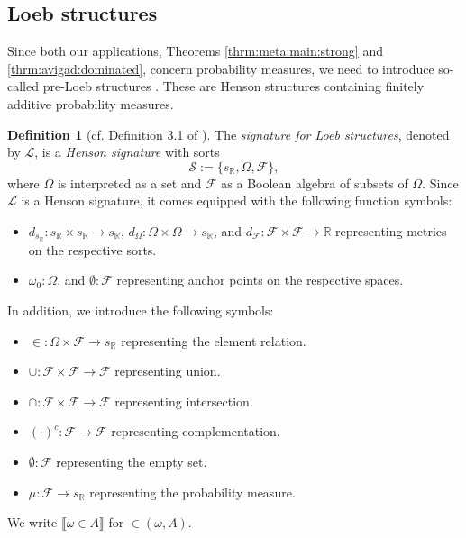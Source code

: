 \documentclass[11pt]{amsart}
\theoremstyle{definition}
\newtheorem{definition}[theorem]{Definition}
\theoremstyle{remark}
\def\RR{\mathbb{R}}
\newcommand{\model}[1]{\llbracket {#1} \rrbracket }
\begin{document}
\subsection{Loeb structures}
\label{subsec:ultra}
Since both our applications, Theorems \ref{thrm:meta:main:strong} and \ref{thrm:avigad:dominated}, concern probability measures, we need to introduce so-called pre-Loeb structures \cite{DI2017}. These are Henson structures containing finitely additive probability measures.
\begin{definition}[cf. Definition 3.1 of \cite{DI2017}]
    The \emph{signature for Loeb structures}, denoted by $\mathcal{L}$, is a \emph{Henson signature} with sorts
    \[
    \mathcal{S} := \{s_\RR, \Omega, \mathcal{F}\},
    \]
    where $\Omega$ is interpreted as a set and $\mathcal{F}$ as a Boolean algebra of subsets of $\Omega$. Since $\mathcal{L}$ is a Henson signature, it comes equipped with the following function symbols:
    \begin{itemize}
        \item $d_{s_\RR}: s_\RR\times s_\RR\to s_\RR$, $d_{\Omega}: \Omega \times \Omega \to s_\RR$, and $d_{\mathcal{F}}: \mathcal{F} \times \mathcal{F} \to \RR$ representing metrics on the respective sorts.
        \item $\omega_0: \Omega$, and $\emptyset: \mathcal{F}$ representing anchor points on the respective spaces.
   
    \end{itemize}

    In addition, we introduce the following symbols:
    \begin{itemize}
        \item $\in: \Omega \times \mathcal{F} \to s_\RR$ representing the element relation.
        \item $\cup: \mathcal{F} \times \mathcal{F} \to \mathcal{F}$ representing union.
        \item $\cap: \mathcal{F} \times \mathcal{F} \to \mathcal{F}$ representing intersection.
        \item $(\cdot)^c: \mathcal{F} \to \mathcal{F}$ representing complementation.
        \item $\emptyset: \mathcal{F}$ representing the empty set.
        \item $\mu: \mathcal{F} \to s_\RR$ representing the probability measure.
    \end{itemize}
    We write $\model{\omega \in A}$ for $\in(\omega,A)$.
    

\end{definition}
\end{document}
